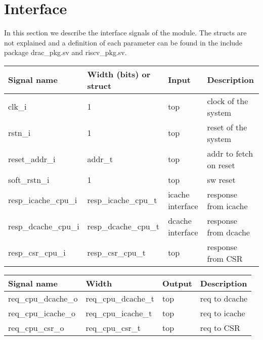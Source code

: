 \section{Interface}
\label{chapter 4}

In this section we describe the interface signals of the module. The structs are not explained and a definition of each parameter can be found in the include package drac\_pkg.sv and riscv\_pkg.sv. 

\begin{table}[h!]
\centering
\begin{tabular}{l|l|l|p{3cm}}
\hline \hline
Signal name & Width (bits) or struct & Input & Description \\
\hline \hline
clk\_i  & 1 & top & clock of the system \\ \hline
rstn\_i & 1 & top & reset of the system \\ \hline
reset\_addr\_i & addr\_t & top & addr to fetch on reset\\ \hline
soft\_rstn\_i & 1 & top & sw reset\\ \hline
resp\_icache\_cpu\_i & resp\_icache\_cpu\_t & icache interface & response from icache \\ \hline
resp\_dcache\_cpu\_i & resp\_dcache\_cpu\_t & dcache interface & response from dcache \\ \hline 
resp\_csr\_cpu\_i & resp\_csr\_cpu\_t & top & response from CSR \\ 
\hline
\end{tabular}
\end{table}

\begin{table}[H]
\centering
\begin{tabular}{l|l|l|p{3cm}}
\hline \hline
Signal name & Width & Output & Description \\
\hline \hline
req\_cpu\_dcache\_o & req\_cpu\_dcache\_t & top & req to dcache \\ 
\hline
req\_cpu\_icache\_o & req\_cpu\_icache\_t & top & req to icache \\ 
\hline
req\_cpu\_csr\_o & req\_cpu\_csr\_t & top & req to CSR \\ 
\hline
\end{tabular}
\end{table}


